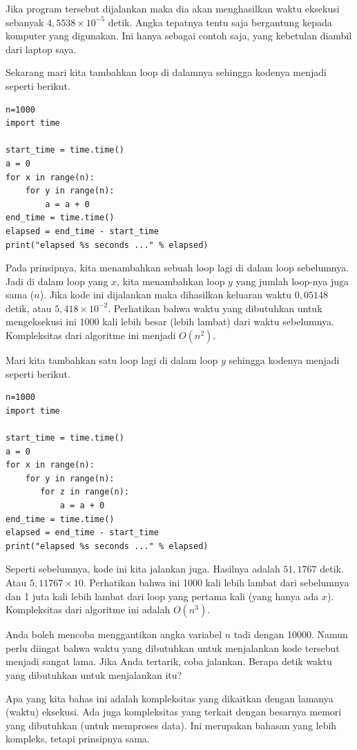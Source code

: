 Jika program tersebut dijalankan maka dia akan menghasilkan waktu eksekusi
sebanyak $4,5538 \times 10^{-5}$ detik.
Angka tepatnya tentu saja bergantung kepada komputer yang digunakan.
Ini hanya sebagai contoh saja, yang kebetulan diambil dari laptop saya.

Sekarang mari kita tambahkan loop di dalamnya sehingga kodenya menjadi seperti berikut.

\begin{verbatim}
n=1000
import time

start_time = time.time()
a = 0
for x in range(n):
    for y in range(n):
        a = a + 0
end_time = time.time()
elapsed = end_time - start_time
print("elapsed %s seconds ..." % elapsed)
\end{verbatim}

Pada prinsipnya, kita menambahkan sebuah loop lagi di dalam loop sebelumnya.
Jadi di dalam loop yang $x$, kita menambahkan loop $y$ yang jumlah loop-nya
juga sama ($n$). Jika kode ini dijalankan maka dihasilkan keluaran waktu
$0,05148$ detik, atau $5,418 \times 10^{-2}$.
Perhatikan bahwa waktu yang dibutuhkan untuk mengeksekusi ini 1000 kali
lebih besar (lebih lambat) dari waktu sebelumnya.
Kompleksitas dari algoritme ini menjadi $O(n^2)$.

Mari kita tambahkan satu loop lagi di dalam loop $y$ sehingga kodenya menjadi
seperti berikut.

\begin{verbatim}
n=1000
import time

start_time = time.time()
a = 0
for x in range(n):
    for y in range(n):
       for z in range(n): 
           a = a + 0
end_time = time.time()
elapsed = end_time - start_time
print("elapsed %s seconds ..." % elapsed)
\end{verbatim}

Seperti sebelumnya, kode ini kita jalankan juga. Hasilnya adalah $51,1767$ detik.
Atau $5,11767 \times 10$. Perhatikan bahwa ini 1000 kali lebih lambat dari sebelumnya
dan 1 juta kali lebih lambat dari loop yang pertama kali (yang hanya ada $x$).
Kompleksitas dari algoritme ini adalah $O(n^3)$.

Anda boleh mencoba menggantikan angka variabel $n$ tadi dengan 10000.
Namun perlu diingat bahwa waktu yang dibutuhkan untuk menjalankan kode
tersebut menjadi sangat lama. Jika Anda tertarik, coba jalankan.
Berapa detik waktu yang dibutuhkan untuk menjalankan itu?

Apa yang kita bahas ini adalah kompleksitas yang dikaitkan dengan lamanya
(waktu) eksekusi. Ada juga kompleksitas yang terkait dengan besarnya
memori yang dibutuhkan (untuk memproses data).
Ini merupakan bahasan yang lebih kompleks, tetapi prinsipnya sama.


